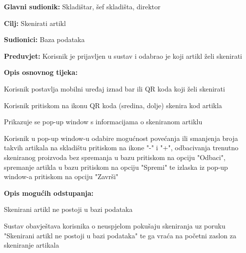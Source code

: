 					\noindent {}
					\begin{packed_item}
	
						\item \textbf{Glavni sudionik: }Skladištar, šef skladišta, direktor
						\item  \textbf{Cilj:} Skenirati artikl
						\item  \textbf{Sudionici:} Baza podataka
						\item  \textbf{Preduvjet:} Korisnik je prijavljen u sustav i odabrao je koji artikl želi skenirati
						\item  \textbf{Opis osnovnog tijeka:}
						
						\item[] \begin{packed_enum}
							
							\item Korisnik postavlja mobilni uređaj iznad bar ili QR koda koji želi skenirati
							\item Korisnik pritiskom na ikonu QR koda (sredina, dolje) skenira kod artikla
							\item Prikazuje se pop-up window s informacijama o skeniranom artiklu
							\item Korisnik u pop-up window-u odabire mogućnost povećanja ili smanjenja broja takvih artikala na skladištu pritiskom na ikone "-" i "+", odbacivanja trenutno skeniranog proizvoda bez spremanja u bazu pritiskom na opciju "Odbaci", spremanje artikla u bazu pritiskom na opciju "Spremi" te izlaska iz pop-up window-a pritiskom na opciju "Završi"
							
						\end{packed_enum}
						
						\item  \textbf{Opis mogućih odstupanja:}
						
						\item[] \begin{packed_item}
	
							\item[2.a] Skenirani artikl ne postoji u bazi podataka
							\item[] \begin{packed_enum}
								
								\item Sustav obavještava korisnika o neuspjelom pokušaju skeniranja uz poruku "Skenirani artikl ne postoji u bazi podataka" te ga vraća na početni zaslon za skeniranje artikala								
							\end{packed_enum}
						

\end{packed_item}
\end{packed_item}
